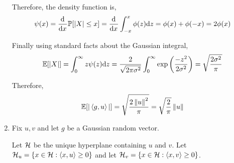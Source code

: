 \documentclass[10pt]{article}
\begin{document}
\begin{solution}[Solution]
\begin{enumerate}[label=(\alph*)]
        Therefore, the density function is,
        \begin{align*}
            \psi(x) = \frac{\mathrm{d}^{}}{\mathrm{d} x^{}} \mathbb{P}[|X|\leq x] 
            = \frac{\mathrm{d}^{}}{\mathrm{d} x^{}} \int_{-x}^{x} \phi(z)\mathrm{d} z
            = \phi(x) + \phi(-x) 
            = 2\phi(x)
        \end{align*}
        
        Finally using standard facts about the Gaussian integral,
        \begin{align*}
            \mathbb{E}[|X|] = \int_{0}^{\infty} z\psi(z)\mathrm{d} z
            = \frac{2}{\sqrt{2\pi\sigma^2}} \int_{0}^{\infty} \exp \left( \frac{-z^2}{2\sigma^2} \right)
            = \sqrt{\frac{2\sigma^2}{\pi}}
        \end{align*}
        
        
        Therefore,
        \begin{align*}
            \mathbb{E}[|\left\langle g,u \right\rangle|] = \sqrt{\frac{2 \left\lVert u\right\rVert^2}{\pi}}
            = \sqrt{\frac{2}{\pi}} \left\lVert u\right\rVert
        \end{align*}
        
    \item Fix \( u,v \) and let \( g \) be a Gaussian random vector.

        Let \( \mathcal{H} \) be the unique hyperplane containing \( u \) and \( v \). Let \( \mathcal{H}_u = \{x\in\mathcal{H} : \left\langle x,u \right\rangle \geq 0 \} \) and let \( \mathcal{H}_v = \{x\in\mathcal{H} : \left\langle x,v \right\rangle \geq 0\} \).


\end{enumerate}
\end{solution}
\end{document}
